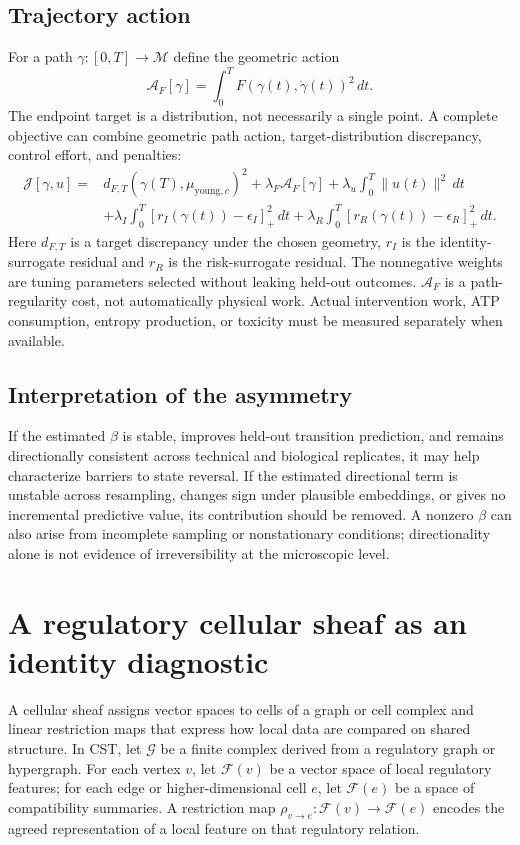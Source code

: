 \documentclass[11pt,a4paper]{article}
\theoremstyle{definition}
\theoremstyle{remark}
\newcommand{\M}{\mathcal{M}}
\newcommand{\G}{\mathcal{G}}
\newcommand{\Fsh}{\mathcal{F}}
\newcommand{\pos}[1]{\left[#1\right]_{+}}
\begin{document}
\subsection{Trajectory action}
For a path $\gamma:[0,T]\rightarrow\M$ define the geometric action
\begin{equation}
\mathcal{A}_{F}[\gamma]=\int_0^T F(\gamma(t),\dot\gamma(t))^2\,dt.
\label{eq:path_action}
\end{equation}
The endpoint target is a distribution, not necessarily a single point. A complete objective can combine geometric path action, target-distribution discrepancy, control effort, and penalties:
\begin{align}
\mathcal{J}[\gamma,u] ={}& d_{F,T}(\gamma(T),\mu_{\mathrm{young},c})^2 + \lambda_F\mathcal{A}_{F}[\gamma]
+\lambda_u\int_0^T \|u(t)\|^2\,dt \nonumber\\
&+\lambda_I\int_0^T \pos{r_I(\gamma(t))-\epsilon_I}^2\,dt
+\lambda_R\int_0^T \pos{r_R(\gamma(t))-\epsilon_R}^2\,dt.
\label{eq:joint_obj}
\end{align}
Here $d_{F,T}$ is a target discrepancy under the chosen geometry, $r_I$ is the identity-surrogate residual and $r_R$ is the risk-surrogate residual. The nonnegative weights are tuning parameters selected without leaking held-out outcomes. $\mathcal{A}_F$ is a path-regularity cost, not automatically physical work. Actual intervention work, ATP consumption, entropy production, or toxicity must be measured separately when available.

\subsection{Interpretation of the asymmetry}
If the estimated $\beta$ is stable, improves held-out transition prediction, and remains directionally consistent across technical and biological replicates, it may help characterize barriers to state reversal. If the estimated directional term is unstable across resampling, changes sign under plausible embeddings, or gives no incremental predictive value, its contribution should be removed. A nonzero $\beta$ can also arise from incomplete sampling or nonstationary conditions; directionality alone is not evidence of irreversibility at the microscopic level.

\section{A regulatory cellular sheaf as an identity diagnostic}
A cellular sheaf assigns vector spaces to cells of a graph or cell complex and linear restriction maps that express how local data are compared on shared structure. In CST, let $\G$ be a finite complex derived from a regulatory graph or hypergraph. For each vertex $v$, let $\Fsh(v)$ be a vector space of local regulatory features; for each edge or higher-dimensional cell $e$, let $\Fsh(e)$ be a space of compatibility summaries. A restriction map $\rho_{v\to e}:\Fsh(v)\rightarrow\Fsh(e)$ encodes the agreed representation of a local feature on that regulatory relation.
\end{document}
